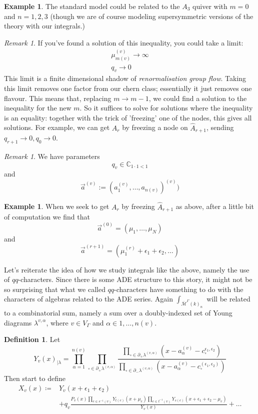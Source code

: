 \documentclass[leqno, openany]{memoir}
\theoremstyle{definition}
\newtheorem{defn}[thm]{Definition}
\newtheorem{exm}[thm]{Example}
\theoremstyle{remark}
\newtheorem{rmk}[thm]{Remark}
\theoremstyle{plain}
\theoremstyle{definition}
\theoremstyle{remark}
\begin{document}
\begin{exm}
The standard model could be related to the $A_3$ quiver with $m=0$ and $n = 1,2,3$ 
(though we are of course modeling supersymmetric versions of the theory with our integrals.)
\end{exm}

\begin{rmk}  
If you've found a solution of this inequality, you could take a limit: 
\begin{align*}
\mu^{(v)}_{m(v)} \to \infty 
\\
q_v \to 0 
\end{align*}
This limit is a finite dimensional shadow of \emph{renormalisation group flow}.
Taking this limit removes one factor from our chern class; essentially it just removes one flavour.
This means that, replacing $m \to m-1$, we could find a solution to the inequality for the new $m$.
So it suffices to solve for solutions where the inequality is an equality:
together with the trick of 'freezing' one of the nodes, this gives all solutions. 
For example, we can get $A_r$ by freezing a node on $\widehat{A}_{r+1}$, sending $q_{r+1}\to0, q_0 \to 0$. 
\end{rmk}

\begin{rmk}
We have parameters 
\[
q_v \in \mathbb{C}_{1 \cdot 1 <1}
\]
and
\[
\vec{a}^{(v)} := (a_1^{(v)},\dots,a_{n(v)})^{(v)})
\]
\end{rmk}

\begin{exm}
When we seek to get $A_r$ by freezing $\widehat{A}_{r+1}$ as above, after a little bit of computation we find that 
\[
\vec{a}^{(0)} = (\mu_1,\dots,\mu_N)
\]
and
\[
\vec{a}^{(r+1)} = (\mu_1^{(r)} + \epsilon_1 + \epsilon_2,\dots)
\]
\end{exm}

Let's reiterate the idea of how we study integrals like the above, namely the use of $qq$-characters.
Since there is some ADE structure to this story, it might not be so surprising that what we called $qq$-characters 
have something to do with the characters of algebras related to the ADE series.
Again $\int_{\overline{\mathcal{M}}^\Gamma(k)_n}$ will be related to a combinatorial sum,
namely a sum over a doubly-indexed set of Young diagrams $\lambda^{v,\alpha}$, where $v \in V_\Gamma$ and $\alpha \in 1,\dots,n(v)$. 

\begin{defn}
Let 
\[
Y_v(x)_{|\lambda} = \prod_{\alpha = 1}^{n(v)} \prod_{\square \in \partial_+ \lambda^{(v,\alpha)}} \frac{\prod_{\square \in \partial_+ \lambda^{(v,\alpha)}} (x - a_\alpha^{(v)} - c_\square^{\epsilon_1,\epsilon_2})}{\prod_{\square \in \partial_- \lambda^{(v,\alpha)}} (x - a_\alpha^{(v)} - c_\square^{(\epsilon_1,\epsilon_2)})}
\]
Then start to define
\begin{align*}
    X_v(x) \coloneqq{}& Y_v(x + \epsilon_1 + \epsilon_2) \\
    &+ q_v \frac{P_v(x)\prod_{e \in s^{-1}(v)} Y_{t(e)}(x +\mu_e) \prod_{e \in t^{-1}(v)} Y_{s(e)} (x + \epsilon_1 + \epsilon_2 - \mu_e)}{Y_v(x)} + \dots 
\end{align*}
\end{defn}
\end{document}

